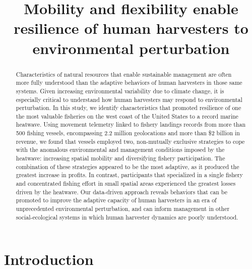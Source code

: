 \documentclass[]{elsarticle} %
\begin{document}
\begin{frontmatter}

  \title{Mobility and flexibility enable resilience of human harvesters to
environmental perturbation}
      
  \begin{abstract}
  Characteristics of natural resources that enable sustainable management
  are often more fully understood than the adaptive behaviors of human
  harvesters in those same systems. Given increasing environmental
  variability due to climate change, it is especially critical to
  understand how human harvesters may respond to environmental
  perturbation. In this study, we identify characteristics that promoted
  resilience of one the most valuable fisheries on the west coast of the
  United States to a record marine heatwave. Using movement telemetry
  linked to fishery landings records from more than 500 fishing vessels,
  encompassing 2.2 million geolocations and more than \$2 billion in
  revenue, we found that vessels employed two, non-mutually exclusive
  strategies to cope with the anomalous environmental and management
  conditions imposed by the heatwave: increasing spatial mobility and
  diversifying fishery participation. The combination of these strategies
  appeared to be the most adaptive, as it produced the greatest increase
  in profits. In contrast, participants that specialized in a single
  fishery and concentrated fishing effort in small spatial areas
  experienced the greatest losses driven by the heatwave. Our data-driven
  approach reveals behaviors that can be promoted to improve the adaptive
  capacity of human harvesters in an era of unprecedented environmental
  perturbation, and can inform management in other social-ecological
  systems in which human harvester dynamics are poorly understood.
  \end{abstract}
  
 \end{frontmatter}

\hypertarget{intro}{%
\section{Introduction}\label{intro}}
\end{document}
